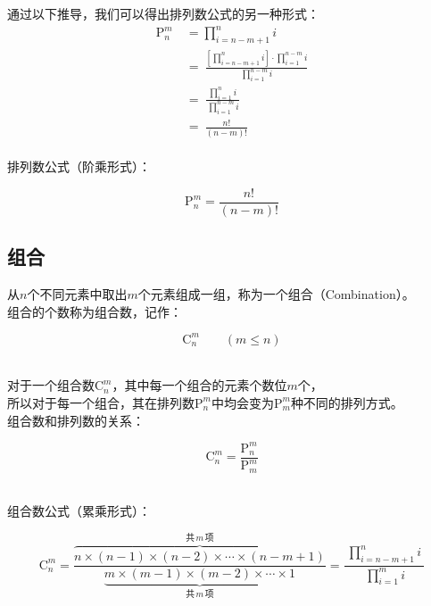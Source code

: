 \documentclass[UTF8]{ctexart}
\begin{document}
    通过以下推导，我们可以得出排列数公式的另一种形式：\vspace{5pt}
    \setcounter{equation}{0}
    \begin{align}
        \mathrm{P}_n^m~
        &=\prod_{i=n-m+1}^n i\\[8mm]
        &=~\frac{\left[\prod\limits_{i=n-m+1}^n i\right]\cdot\prod\limits_{i=1}^{n-m} i}{\prod\limits_{i=1}^{n-m} i}\\[2mm]
        &=~\frac{~\prod\limits_{i=1}^{n}i~}{\,\prod\limits_{i=1}^{n-m} i}\\[6mm]
        &=~\frac{n!}{(n-m)!}
    \end{align}\\
    排列数公式（阶乘形式）：
    \begin{large}
        \begin{equation*}
            \mathrm{P}_n^m=\frac{n!}{(n-m)!}
        \end{equation*}
    \end{large}

\subsection{组合}
    从$n$个不同元素中取出$m$个元素组成一组，称为一个组合（Combination）。\\[3mm]
    组合的个数称为组合数，记作：
    \begin{large}
        \begin{equation*}
            \mathrm{C}_n^m\qquad(m\leq n)
        \end{equation*}
    \end{large}\\
    对于一个组合数$\mathrm{C}_n^m$，其中每一个组合的元素个数位$m$个，\\[2mm]
    所以对于每一个组合，其在排列数$\mathrm{P}_n^m$中均会变为$\mathrm{P}_m^m$种不同的排列方式。\\[4mm]
    组合数和排列数的关系：
    \begin{large}
        \begin{equation*}
            \mathrm{C}_n^m=\frac{\mathrm{P}_n^m}{\mathrm{P}_m^m}
        \end{equation*}        
    \end{large}\\
    组合数公式（累乘形式）：
    \begin{large}
        \begin{equation*}
            \mathrm{C}_n^m=\frac{\overbrace{n\times(n-1)\times(n-2)\times\cdots\times(n-m+1)}^{\text{共}\,m\,\text{项}}}{\underbrace{m\times(m-1)\times(m-2)\times\cdots\times 1}_{\text{共}\,m\,\text{项}}}=\frac{~\prod\limits_{i=n-m+1}^{n}i~}{\,\prod\limits_{i=1}^{m}i}
        \end{equation*}
    \end{large}
    
\end{document}
